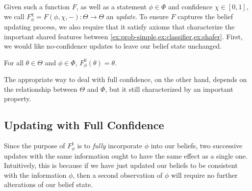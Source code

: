 Given such a function $F$, as well as a statement $\phi \in \Phi$
and confidence $\chi \in [0,1]$, we call 
$F^\chi_\phi = F(\phi, \chi, -) : \Theta \to \Theta$
an \emph{update}.
To ensure $F$ captures the belief updating process, we also require that it satisfy axioms
that characterize the important shared features between \cref{ex:prob-simple,ex:classifier,ex:shafer}.
First, we would like no-confidence updates to leave our belief state unchanged. 

\begin{CFaxioms}
	\item
		For all $\theta \in \Theta$ and $\phi \in \Phi$,
		 $F^{0}_\phi(\theta) = \theta$.
		\label{ax:zero}
\end{CFaxioms}


The appropriate way to deal with full confidence, on the other hand,
depends on the relationship between $\Theta$ and $\Phi$,
but it still characterized by an important property.


\subsection{Updating with Full Confidence}
Since the purpose of $F^1_\phi$ is to \emph{fully} incorporate $\phi$ into our beliefs,
two successive updates with the same information ought to have the same effect as a single one.
Intuitively, this is because if we have just updated our beliefs to be consistent with the information $\phi$, then a second observation of $\phi$ will require no further alterations of our belief state.

